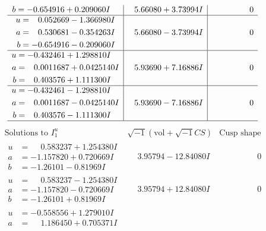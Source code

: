 \documentclass[1p]{elsarticle_modified}
\theoremstyle{definition}
\newcommand{\I}{\sqrt{-1}}
\begin{document}
$$\begin{array}{c|c|c}
\begin{aligned}
b &= -0.654916 + 0.209060 I\end{aligned}
 & \phantom{-}5.66080 + 3.73994 I & \phantom{-0.000000 } 0 \\ \hline\begin{aligned}
u &= \phantom{-}0.052669 - 1.366980 I \\
a &= \phantom{-}0.530681 - 0.354263 I \\
b &= -0.654916 - 0.209060 I\end{aligned}
 & \phantom{-}5.66080 - 3.73994 I & \phantom{-0.000000 } 0 \\ \hline\begin{aligned}
u &= -0.432461 + 1.298810 I \\
a &= \phantom{-}0.0011687 + 0.0425140 I \\
b &= \phantom{-}0.403576 + 1.111300 I\end{aligned}
 & \phantom{-}5.93690 + 7.16886 I & \phantom{-0.000000 } 0 \\ \hline\begin{aligned}
u &= -0.432461 - 1.298810 I \\
a &= \phantom{-}0.0011687 - 0.0425140 I \\
b &= \phantom{-}0.403576 - 1.111300 I\end{aligned}
 & \phantom{-}5.93690 - 7.16886 I & \phantom{-0.000000 } 0\\
 \hline 
 \end{array}$$\newpage$$\begin{array}{c|c|c}  
\text{Solutions to }I^u_{1}& \I (\text{vol} + \sqrt{-1}CS) & \text{Cusp shape}\\
 \hline 
\begin{aligned}
u &= \phantom{-}0.583237 + 1.254380 I \\
a &= -1.157820 + 0.720669 I \\
b &= -1.26101 - 0.81969 I\end{aligned}
 & \phantom{-}3.95794 - 12.84080 I & \phantom{-0.000000 } 0 \\ \hline\begin{aligned}
u &= \phantom{-}0.583237 - 1.254380 I \\
a &= -1.157820 - 0.720669 I \\
b &= -1.26101 + 0.81969 I\end{aligned}
 & \phantom{-}3.95794 + 12.84080 I & \phantom{-0.000000 } 0 \\ \hline\begin{aligned}
u &= -0.558556 + 1.279010 I \\
a &= \phantom{-}1.186450 + 0.705371 I \\

\end{aligned}
\end{array}$$
\end{document}
